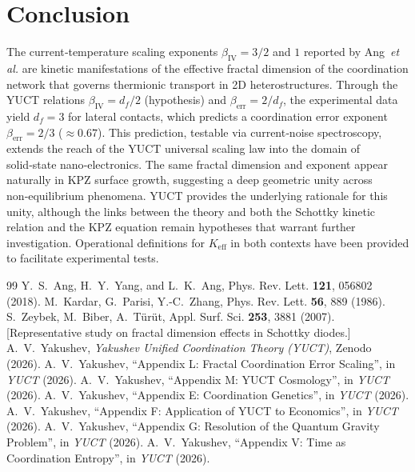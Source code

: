 \documentclass[12pt,a4paper]{article}
\newcommand{\Keff}{K_{\mathrm{eff}}}
\begin{document}
	\section{Conclusion}
	The current‑temperature scaling exponents $\beta_{\mathrm{IV}} = 3/2$
	and $1$ reported by Ang~\emph{et al.} are kinetic manifestations
	of the effective fractal dimension of the coordination network that
	governs thermionic transport in 2D heterostructures. Through the
	YUCT relations $\beta_{\mathrm{IV}} = d_f/2$ (hypothesis) and
	$\beta_{\mathrm{err}} = 2/d_f$, the experimental data yield
	$d_f = 3$ for lateral contacts, which predicts a coordination error
	exponent $\beta_{\mathrm{err}} = 2/3$ ($\approx 0.67$). This
	prediction, testable via current‑noise spectroscopy, extends the
	reach of the YUCT universal scaling law into the domain of
	solid‑state nano‑electronics. The same fractal dimension and
	exponent appear naturally in KPZ surface growth, suggesting a
	deep geometric unity across non‑equilibrium phenomena. YUCT
	provides the underlying rationale for this unity, although the
	links between the theory and both the Schottky kinetic relation
	and the KPZ equation remain hypotheses that warrant further
	investigation. Operational definitions for $\Keff$ in both contexts
	have been provided to facilitate experimental tests.
	
	\begin{thebibliography}{99}
		 Y.~S.~Ang, H.~Y.~Yang, and L.~K.~Ang,
		Phys. Rev. Lett. \textbf{121}, 056802 (2018).
		 M.~Kardar, G.~Parisi, Y.-C.~Zhang,
		Phys. Rev. Lett. \textbf{56}, 889 (1986).
		 S.~Zeybek, M.~Biber, A.~Türüt,
		Appl. Surf. Sci. \textbf{253}, 3881 (2007). [Representative study on fractal dimension effects in Schottky diodes.]
		 A.~V.~Yakushev, \emph{Yakushev Unified
			Coordination Theory (YUCT)}, Zenodo (2026).
		 A.~V.~Yakushev, ``Appendix L: Fractal
		Coordination Error Scaling'', in \emph{YUCT} (2026).
		 A.~V.~Yakushev, ``Appendix M: YUCT
		Cosmology'', in \emph{YUCT} (2026).
		 A.~V.~Yakushev, ``Appendix E: Coordination
		Genetics'', in \emph{YUCT} (2026).
		 A.~V.~Yakushev, ``Appendix F: Application of
		YUCT to Economics'', in \emph{YUCT} (2026).
		 A.~V.~Yakushev, ``Appendix G: Resolution of
		the Quantum Gravity Problem'', in \emph{YUCT} (2026).
		 A.~V.~Yakushev, ``Appendix V: Time as
		Coordination Entropy'', in \emph{YUCT} (2026).
	\end{thebibliography}
	
\end{document}

